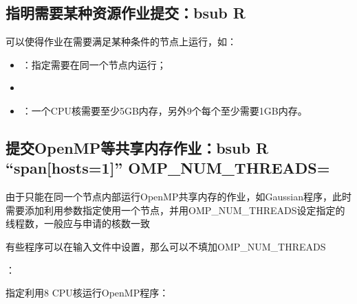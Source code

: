 \documentclass[a4paper,12pt,english]{sphinxmanual}
\begin{document}
\subsection{指明需要某种资源作业提交：bsub \sphinxhyphen{}R}
\label{\detokenize{lsf/lsf:bsub-r}}
\sphinxAtStartPar
{}可以使得作业在需要满足某种条件的节点上运行，如：
\begin{itemize}
\item {} 
\sphinxAtStartPar
{}：指定需要在同一个节点内运行；

\item {} 

\item {} 
\sphinxAtStartPar
{}：一个CPU核需要至少5GB内存，另外9个每个至少需要1GB内存。

\end{itemize}


\subsection{提交OpenMP等共享内存作业：bsub \sphinxhyphen{}R “span{[}hosts=1{]}” OMP\_NUM\_THREADS=}
\label{\detokenize{lsf/lsf:openmp-bsub-r-span-hosts-1-omp-num-threads}}
\sphinxAtStartPar
由于只能在同一个节点内部运行OpenMP共享内存的作业，如Gaussian程序，此时需要添加利用参数指定使用一个节点，并用OMP\_NUM\_THREADS设定指定的线程数，一般应与申请的核数一致 %
\begin{footnote}[1]\sphinxAtStartFootnote
有些程序可以在输入文件中设置，那么可以不填加OMP\_NUM\_THREADS
%
\end{footnote}：

\sphinxAtStartPar
指定利用8 CPU核运行OpenMP程序：

\sphinxAtStartPar
{}
\end{document}
